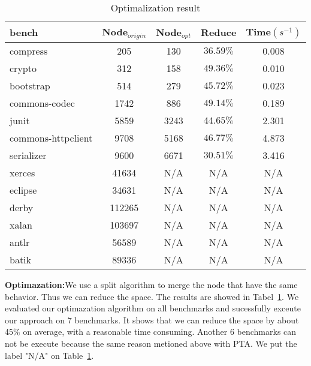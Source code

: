 \documentclass{llncs}
\begin{document}
\begin{table}[!htbp]\centering
\caption{Optimalization result}
\begin{tabular}{lcccc}
	\hline
	\textbf{bench} & \textbf{Node$_{origin}$} & \textbf{Node$_{opt}$} & \textbf{Reduce} & \textbf{Time$(s^{-1})$} \\
	\hline
	compress & 205 & 130 & $36.59\%$ & 0.008 \\
	crypto & 312 & 158 & $49.36\%$ & 0.010 \\
	bootstrap & 514 & 279 & $45.72\%$ & 0.023 \\
	commons-codec & 1742 & 886 & $49.14\%$ & 0.189 \\
	junit & 5859 & 3243 & $44.65\%$ & 2.301 \\
	commons-httpclient & 9708 & 5168 & $46.77\%$ & 4.873 \\
	serializer & 9600 & 6671 & $30.51\%$ & 3.416 \\
	xerces & 41634 & N/A & N/A & N/A\\
	eclipse & 34631 & N/A & N/A & N/A\\
	derby & 112265 & N/A & N/A & N/A\\
	xalan & 103697 & N/A & N/A & N/A\\
	antlr & 56589 & N/A & N/A & N/A\\
	batik & 89336 & N/A & N/A & N/A\\
	\hline
\end{tabular}
\label{experiment:Optimalization}
\end{table}

\textbf{Optimazation:}We use a split algorithm to merge the node that have the same behavior. Thus we can reduce the space. The results are showed in Tabel~\ref{experiment:Optimalization}. We evaluated our optimazation algorithm on all benchmarks and sucessfully exceute our approach on 7 benchmarks. It shows that we can reduce the space by about 45$\%$ on average, with a reasonable time consuming. Another 6 benchmarks can not be execute because the same reason metioned above with PTA. We put the label "N/A" on Table~\ref{experiment:Optimalization}.  
\end{document}
